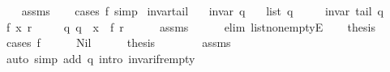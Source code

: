 \begin{isabellebody}
\endisataginvisible
{\isafoldinvisible}%
%
\isadeliminvisible
\isanewline
%
\endisadeliminvisible
%
\isadelimproof
\ \ %
\endisadelimproof
%
\isatagproof
{}\isamarkupfalse%
\ assms\isanewline
\ \ \isamarkupfalse%
\ {\isacharparenleft}{\kern0pt}cases\ f{\isacharparenright}{\kern0pt}\ simp{\isacharplus}{\kern0pt}%
\endisatagproof
{\isafoldproof}%
%
\isadelimproof
\isanewline
%
\endisadelimproof
%
\isadeliminvisible
\isanewline
%
\endisadeliminvisible
%
\isataginvisible
{}\isamarkupfalse%
\ invar{\isacharunderscore}{\kern0pt}tail{\isacharcolon}{\kern0pt}\isanewline
\ \ \ {\isachardoublequoteopen}invar\ q{\isachardoublequoteclose}\isanewline
\ \ \ {\isachardoublequoteopen}list\ q\ {\isasymnoteq}\ {\isacharbrackleft}{\kern0pt}{\isacharbrackright}{\kern0pt}{\isachardoublequoteclose}\isanewline
\ \ \ {\isachardoublequoteopen}invar\ {\isacharparenleft}{\kern0pt}tail\ q{\isacharparenright}{\kern0pt}{\isachardoublequoteclose}%
\endisataginvisible
{\isafoldinvisible}%
%
\isadeliminvisible
\isanewline
%
\endisadeliminvisible
%
\isadelimproof
%
\endisadelimproof
%
\isatagproof
{}\isamarkupfalse%
\ {\isacharminus}{\kern0pt}\isanewline
\ \ \isamarkupfalse%
\ f\ x\ r\ \isanewline
\ \ \ \ q{\isacharcolon}{\kern0pt}\ {\isachardoublequoteopen}q\ {\isacharequal}{\kern0pt}\ {\isacharparenleft}{\kern0pt}x\ {\isacharhash}{\kern0pt}\ f{\isacharcomma}{\kern0pt}\ r{\isacharparenright}{\kern0pt}{\isachardoublequoteclose}\isanewline
\ \ \ \ \isamarkupfalse%
\ assms\isanewline
\ \ \ \ \isamarkupfalse%
\ {\isacharparenleft}{\kern0pt}elim\ list{\isacharunderscore}{\kern0pt}non{\isacharunderscore}{\kern0pt}emptyE{\isacharparenright}{\kern0pt}\isanewline
\ \ \isamarkupfalse%
\ {\isacharquery}{\kern0pt}thesis\isanewline
\ \ \isamarkupfalse%
\ {\isacharparenleft}{\kern0pt}cases\ f{\isacharparenright}{\kern0pt}\isanewline
\ \ \ \ \isamarkupfalse%
\ Nil\isanewline
\ \ \ \ \isamarkupfalse%
\ {\isacharquery}{\kern0pt}thesis\isanewline
\ \ \ \ \ \ \isamarkupfalse%
\ assms\isanewline
\ \ \ \ \ \ \isamarkupfalse%
\ {\isacharparenleft}{\kern0pt}auto\ simp\ add{\isacharcolon}{\kern0pt}\ q\ intro{\isacharcolon}{\kern0pt}\ invar{\isacharunderscore}{\kern0pt}if{\isacharunderscore}{\kern0pt}r{\isacharunderscore}{\kern0pt}empty{\isacharparenright}{\kern0pt}\isanewline
\ \ \isamarkupfalse%
\isanewline

\end{isabellebody}
